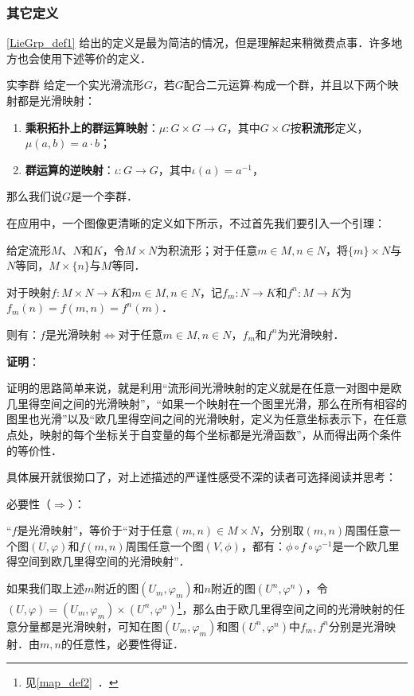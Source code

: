 \subsubsection{其它定义}

\autoref{LieGrp_def1} 给出的定义是最为简洁的情况，但是理解起来稍微费点事．许多地方也会使用下述等价的定义．

\begin{definition}{实李群}\label{LieGrp_def3}
给定一个实光滑流形$G$，若$G$配合二元运算$\cdot$构成一个群，并且以下两个映射都是光滑映射：
\begin{enumerate}
\item \textbf{乘积拓扑上的群运算映射}：$\mu:G\times G\to G$，其中$G\times G$按\textbf{积流形}定义，$\mu(a,b)=a\cdot b$；
\item \textbf{群运算的逆映射}：$\iota:G\to G$，其中$\iota(a)=a^{-1}$，
\end{enumerate}
那么我们说$G$是一个李群．
\end{definition}

在应用中，一个图像更清晰的定义如下所示，不过首先我们要引入一个引理：

\begin{lemma}{}\label{LieGrp_lem1}
给定流形$M$、$N$和$K$，令$M\times N$为积流形；对于任意$m\in M, n\in N$，将$\{m\}\times N$与$N$等同，$M\times \{n\}$与$M$等同．

对于映射$f:M\times N\to K$和$m\in M, n\in N$，记$f_m:N\to K$和$f^n:M\to K$为$f_m(n)=f(m, n)=f^n(m)$．

则有：$f$是光滑映射$\iff$对于任意$m\in M, n\in N$，$f_m$和$f^n$为光滑映射．
\end{lemma}

\textbf{证明}：

证明的思路简单来说，就是利用“流形间光滑映射的定义就是在任意一对图中是欧几里得空间之间的光滑映射”，“如果一个映射在一个图里光滑，那么在所有相容的图里也光滑”以及“欧几里得空间之间的光滑映射，定义为任意坐标表示下，在任意点处，映射的每个坐标关于自变量的每个坐标都是光滑函数”，从而得出两个条件的等价性．

具体展开就很拗口了，对上述描述的严谨性感受不深的读者可选择阅读并思考：

必要性（$\Rightarrow$）：

“$f$是光滑映射”，等价于“对于任意$(m, n)\in M\times N$，分别取$(m, n)$周围任意一个图$(U, \varphi)$和$f(m, n)$周围任意一个图$(V, \phi)$，都有：$\phi\circ f\circ\varphi^{-1}$是一个欧几里得空间到欧几里得空间的光滑映射”．

如果我们取上述$m$附近的图$(U_m, \varphi_m)$和$n$附近的图$(U^n, \varphi^n)$，令$(U, \varphi)=(U_m, \varphi_m)\times(U^n, \varphi^n)$\footnote{见\autoref{map_def2}~．}，那么由于欧几里得空间之间的光滑映射的任意分量都是光滑映射，可知在图$(U_m, \varphi_m)$和图$(U^n, \varphi^n)$中$f_m, f^n$分别是光滑映射．由$m, n$的任意性，必要性得证．

